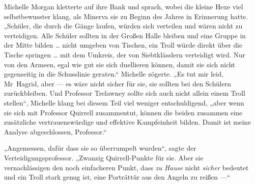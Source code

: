 Michelle Morgan kletterte auf ihre Bank und sprach, wobei die kleine Hexe viel selbstbewusster klang, als Minerva sie zu Beginn des Jahres in Erinnerung hatte.
„Schüler, die durch die Gänge laufen, würden sich verteilen und wären nicht zu verteidigen. Alle Schüler sollten in der Großen Halle bleiben und eine Gruppe in der Mitte bilden … nicht umgeben von Tischen, ein Troll würde direkt über die Tische springen … mit dem Umkreis, der von Siebtklässlern verteidigt wird. Nur von den Armeen, egal wie gut sie sich duellieren können, damit sie sich nicht gegenseitig in die Schusslinie geraten.“ Michelle zögerte.
„Es tut mir leid, Mr~Hagrid, aber — es wäre nicht sicher für sie, sie sollten bei den Schülern zurückbleiben. Und Professor Trelawney sollte sich auch nicht allein einem Troll stellen“, Michelle klang bei diesem Teil viel weniger entschuldigend, „aber wenn sie sich mit Professor Quirrell zusammentut, können die beiden zusammen eine zusätzliche vertrauenswürdige und effektive Kampfeinheit bilden. Damit ist meine Analyse abgeschlossen, Professor.“

„Angemessen, dafür dass sie so überrumpelt wurden“, sagte der Verteidigungsprofessor.
„Zwanzig Quirrell-Punkte für sie. Aber sie vernachlässigen den noch einfacheren Punkt, dass \emph{zu Hause} nicht \emph{sicher} bedeutet und ein Troll stark genug ist, eine Porträttür aus den Angeln zu reißen —“

